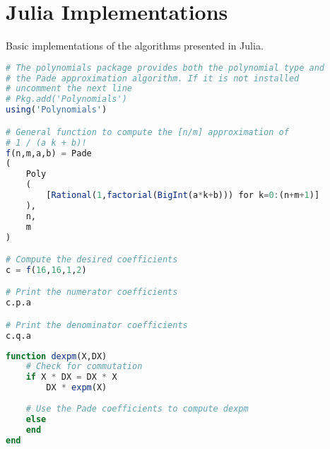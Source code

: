 \chapter{Julia Implementations}
Basic implementations of the algorithms presented in Julia.

\begin{lstlisting}[language=Julia,caption=Poor man's symbolic computation of the Pade coefficients of the generalized hyperbolic functions in Julia]
# The polynomials package provides both the polynomial type and
# the Pade approximation algorithm. If it is not installed 
# uncomment the next line
# Pkg.add('Polynomials')
using('Polynomials')

# General function to compute the [n/m] approximation of
# 1 / (a k + b)!
f(n,m,a,b) = Pade
(
	Poly
	(
		[Rational(1,factorial(BigInt(a*k+b))) for k=0:(n+m+1)]
	),
	n,
	m
)

# Compute the desired coefficients
c = f(16,16,1,2)

# Print the numerator coefficients
c.p.a

# Print the denominator coefficients
c.q.a
\end{lstlisting}

\begin{lstlisting}[language=Julia,caption=An unoptimized implementation of gradient of the matrix exponential in Julia]
function dexpm(X,DX)
	# Check for commutation
	if X * DX = DX * X
		DX * expm(X)
		
	# Use the Pade coefficients to compute dexpm
	else
	end
end
\end{lstlisting}
